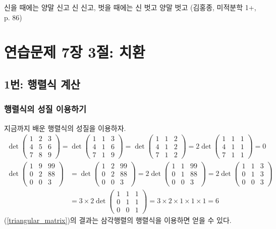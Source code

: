 \begin{displayquote}
신을 때에는 양말 신고 신 신고, 벗을 때에는 신 벗고 양말 벗고 (김홍종, 미적분학 1+, p. 86)
\end{displayquote}

\section{연습문제 7장 3절: 치환}
\subsection{1번: 행렬식 계산}
\subsubsection{행렬식의 성질 이용하기}
지금까지 배운 행렬식의 성질을 이용하자.
\begin{align*}
\det\begin{pmatrix}
1 & 2 & 3\\
4 & 5 & 6\\
7 & 8 & 9
\end{pmatrix}=\det\begin{pmatrix}
1 & 1 & 3\\
4 & 1 & 6\\
7 & 1 & 9
\end{pmatrix}=\det\begin{pmatrix}
1 & 1 & 2\\
4 & 1 & 2\\
7 & 1 & 2
\end{pmatrix}=2\det\begin{pmatrix}
1 & 1 & 1\\
4 & 1 & 1\\
7 & 1 & 1
\end{pmatrix}=0
\end{align*}
\begin{align}
\det\begin{pmatrix}
1 & 9 & 99\\
0 & 2 & 88\\
0 & 0 & 3
\end{pmatrix}&=\det\begin{pmatrix}
1 & 2 & 99\\
0 & 2 & 88\\
0 & 0 & 3
\end{pmatrix}=2\det\begin{pmatrix}
1 & 1 & 99\\
0 & 1 & 88\\
0 & 0 & 3
\end{pmatrix}=2\det\begin{pmatrix}
1 & 1 & 3\\
0 & 1 & 3\\
0 & 0 & 3
\end{pmatrix} \nonumber\\
\label{triangular_matrix}&=3\times2\det\begin{pmatrix}
1 & 1 & 1\\
0 & 1 & 1\\
0 & 0 & 1
\end{pmatrix}=3\times2\times1\times1\times1=6
\end{align}
(\ref{triangular_matrix})의 결과는 삼각행렬의 행렬식을 이용하면 얻을 수 있다.

